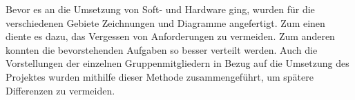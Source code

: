 \label{Entwurf}

Bevor es an die Umsetzung von Soft- und Hardware ging, wurden für die verschiedenen Gebiete Zeichnungen und Diagramme angefertigt. Zum einen diente es dazu, das Vergessen von Anforderungen zu vermeiden. Zum anderen konnten die bevorstehenden Aufgaben so besser verteilt werden. Auch die Vorstellungen der einzelnen Gruppenmitgliedern in Bezug auf die Umsetzung des Projektes wurden mithilfe dieser Methode zusammengeführt, um spätere Differenzen zu vermeiden. \\